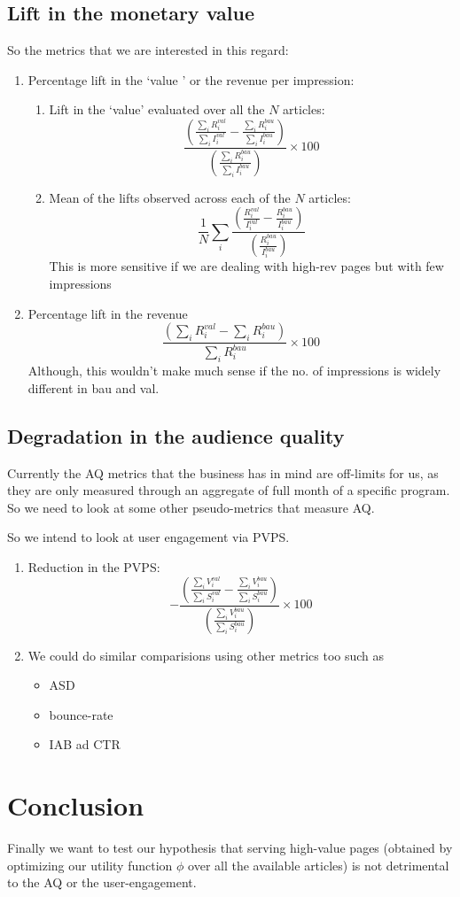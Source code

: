 \documentclass[11]{article}
\begin{document}
\subsection{Lift in the monetary value}
So the metrics that we are interested in this regard:
\begin{enumerate}

\item Percentage lift in the `value ' or the revenue per impression:

\begin{enumerate}
\item Lift in the `value' evaluated over all the $N$ articles:
\[    \dfrac{\left(  \frac{\sum_i R_i^{val}}{\sum_i I_i^{val}} - \frac{\sum_i R_i^{bau}}{\sum_i I_i^{bau}} \right)}{ \left( \frac{\sum_i R_i^{bau}}{\sum_i I_i^{bau}} \right) } \times 100   \]
\item Mean of the lifts observed across each of the $N$ articles:
\[     \frac{1}{N} \sum_i   \dfrac{  \left(  \frac{R^{val}_i}{I^{val}_i}  - \frac{R^{bau}_i}{I^{bau}_i}  \right)  }{\left( \frac{R^{bau}_i}{I^{bau}_i} \right)}      \]
This is more sensitive if we are dealing with high-rev pages but with few impressions
\end{enumerate}



\item Percentage lift in the revenue 
\[    \dfrac{\left( \sum_i R_i^{val}- \sum_i R_i^{bau} \right)}{\sum_i R_i^{bau}} \times 100   \]
Although, this wouldn't make much sense if the no. of impressions is widely different in bau and val.
\end{enumerate}

\subsection{Degradation in the audience quality}
Currently the AQ metrics that the business has in mind are off-limits for us, as they are only measured through an aggregate of full month of a specific program. So we need to look at some other pseudo-metrics that measure AQ.

So we intend to look at user engagement via PVPS.

\begin{enumerate}

\item  Reduction in the PVPS:
\[  -  \dfrac{\left(  \frac{\sum_i V_i^{val}}{\sum_i S_i^{val}} - \frac{\sum_i V_i^{bau}}{\sum_i S_i^{bau}} \right)}{ \left( \frac{\sum_i V_i^{bau}}{\sum_i S_i^{bau}} \right) } \times 100   \]
\item We could do similar comparisions using other metrics too such as 

\begin{itemize}
\item ASD
\item bounce-rate
\item IAB ad CTR
\end{itemize}

\end{enumerate}

\section{Conclusion}
Finally we want to test our hypothesis that serving high-value pages (obtained by optimizing our utility function $\phi$ over all the available articles) is not detrimental to the AQ or the user-engagement.
\end{document}
